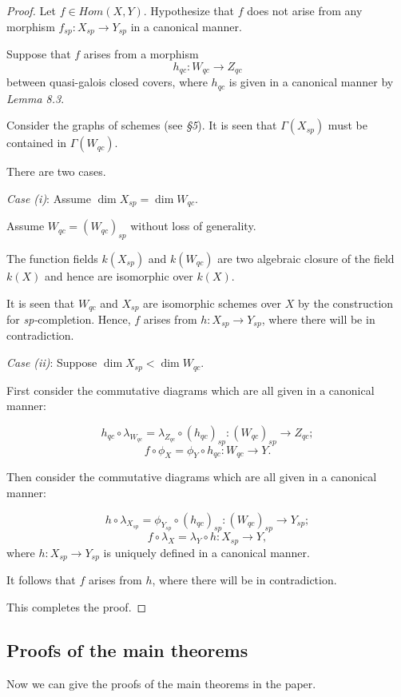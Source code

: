 \documentclass[12pt,twoside,reqno]{amsart}
\theoremstyle{definition}
\numberwithin{equation}{section}
\begin{document}
\begin{proof}
Let $f\in Hom(X,Y)$.
Hypothesize that $f$ does not arise from any morphism $f_{sp}:X_{sp}\to Y_{sp}$ in a canonical manner.

Suppose that $f$ arises from a morphism $$h_{qc}:W_{qc}\to Z_{qc}$$ between quasi-galois closed covers, where $h_{qc}$ is given in a canonical manner by \emph{Lemma 8.3}.

Consider the graphs of schemes (see \emph{\S 5}). It is seen that $\Gamma(X_{sp})$ must be contained in $\Gamma(W_{qc})$.


There are two cases.

\emph{Case (i)}: Assume $\dim X_{sp}=\dim W_{qc}$.

Assume $W_{qc}={(W_{qc})}_{sp}$ without loss of generality.

The function fields $k(X_{sp})$ and $k(W_{qc})$ are two algebraic closure of the field $k(X)$ and hence are isomorphic over $k(X)$.

It is seen that $W_{qc}$ and $ X_{sp}$ are isomorphic schemes over $X$ by the construction for \emph{sp-}completion.
Hence, $f$ arises from $h:X_{sp}\to Y_{sp}$, where there will be in contradiction.

\emph{Case (ii)}: Suppose $\dim X_{sp}<\dim W_{qc}$.


First consider the commutative diagrams which are all given in a canonical manner:

$$h_{qc}\circ \lambda_{W_{qc}}=\lambda_{Z_{qc}}\circ {(h_{qc})}_{sp}: {(W_{qc})}_{sp}\to Z_{qc};$$
$$f\circ \phi_{X}=\phi_{Y}\circ h_{qc}:W_{qc}\to Y.$$

Then consider the commutative diagrams which are all given in a canonical manner:

$$h \circ \lambda_{X_{sp}}=\phi_{Y_{sp}}\circ {(h_{qc})}_{sp}: {(W_{qc})}_{sp}\to Y_{sp};$$
$$f\circ \lambda_{X}=\lambda_{Y}\circ h:X_{sp}\to Y,$$
where $h:X_{sp}\to Y_{sp}$ is uniquely defined in a canonical manner.

It follows that $f$ arises from $h$, where there will be in contradiction.

This completes the proof.
\end{proof}

\subsection{Proofs of the main theorems}

Now we can give the proofs of the  main theorems in the paper.
\end{document}
